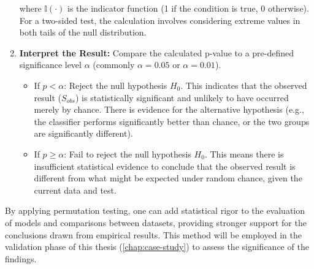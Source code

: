 \begin{enumerate}
          where $\mathbb{I}(\cdot)$ is the indicator function (1 if the condition is true, 0 otherwise). For a two-sided test, the calculation involves considering extreme values in both tails of the null distribution.
    \item \textbf{Interpret the Result:} Compare the calculated p-value to a pre-defined significance level $\alpha$ (commonly $\alpha = 0.05$ or $\alpha = 0.01$).
          \begin{itemize}
              \item If $p < \alpha$: Reject the null hypothesis $H_0$. This indicates that the observed result ($S_{obs}$) is statistically significant and unlikely to have occurred merely by chance. There is evidence for the alternative hypothesis (e.g., the classifier performs significantly better than chance, or the two groups are significantly different).
              \item If $p \ge \alpha$: Fail to reject the null hypothesis $H_0$. This means there is insufficient statistical evidence to conclude that the observed result is different from what might be expected under random chance, given the current data and test.
          \end{itemize}
\end{enumerate}

By applying permutation testing, one can add statistical rigor to the evaluation of models and comparisons between datasets, providing stronger support for the conclusions drawn from empirical results. This method will be employed in the validation phase of this thesis (\autoref{chap:case-study}) to assess the significance of the findings.